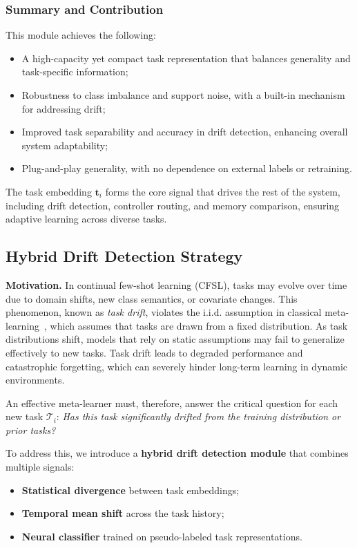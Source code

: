 \documentclass[conference]{IEEEtran}
\begin{document}
\subsubsection*{Summary and Contribution}

This module achieves the following:
\begin{itemize}
    \item A high-capacity yet compact task representation that balances generality and task-specific information;
    \item Robustness to class imbalance and support noise, with a built-in mechanism for addressing drift;
    \item Improved task separability and accuracy in drift detection, enhancing overall system adaptability;
    \item Plug-and-play generality, with no dependence on external labels or retraining.
\end{itemize}

The task embedding $\mathbf{t}_i$ forms the core signal that drives the rest of the system, including drift detection, controller routing, and memory comparison, ensuring adaptive learning across diverse tasks.

\subsection{Hybrid Drift Detection Strategy}

\textbf{Motivation.}  
In continual few-shot learning (CFSL), tasks may evolve over time due to domain shifts, new class semantics, or covariate changes. This phenomenon, known as \emph{task drift}, violates the i.i.d. assumption in classical meta-learning~\cite{finn2017maml,snell2017prototypical}, which assumes that tasks are drawn from a fixed distribution. As task distributions shift, models that rely on static assumptions may fail to generalize effectively to new tasks. Task drift leads to degraded performance and catastrophic forgetting, which can severely hinder long-term learning in dynamic environments.

An effective meta-learner must, therefore, answer the critical question for each new task $\mathcal{T}_i$:  
\textit{Has this task significantly drifted from the training distribution or prior tasks?}

To address this, we introduce a \textbf{hybrid drift detection module} that combines multiple signals:
\begin{itemize}
    \item \textbf{Statistical divergence} between task embeddings;
    \item \textbf{Temporal mean shift} across the task history;
    \item \textbf{Neural classifier} trained on pseudo-labeled task representations.
\end{itemize}
\end{document}
